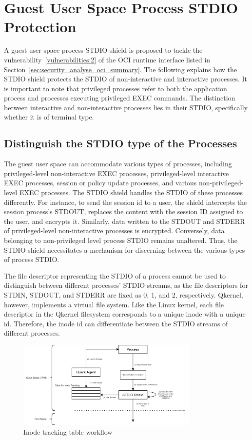 \section{Guest User Space Process STDIO Protection}
\label{sec:design_STDIO_PROTECTION}
A guest user-space process STDIO shield is proposed to tackle the vulnerability~\ref{vulnerabilities:2} of the OCI runtime interface listed in Section~\ref{sec:security_analyse_oci_summary}. The following explains how the STDIO shield protects the STDIO of non-interactive and interactive processes. It is important to note that privileged processes refer to 
both the application process and processes executing privileged EXEC commands. The distinction between interactive and non-interactive processes lies in their STDIO, specifically whether it is of terminal type. 


\subsection{Distinguish the STDIO type of the Processes}
\label{sec:design_Distinguish_io}

The guest user space can accommodate various types of processes, including privileged-level non-interactive EXEC processes, privileged-level interactive EXEC processes, session or policy update processes, and various non-privileged-level EXEC processes. The STDIO shield handles the STDIO of these processes differently. For instance, 
to send the session id to a user, the shield intercepts the session process's STDOUT, replaces the content with the session ID assigned to the user, and encrypts it. Similarly, data written to the STDOUT and STDERR of privileged-level non-interactive processes is encrypted. Conversely, data belonging 
to non-privileged level process STDIO remains unaltered. Thus, the STDIO shield necessitates a mechanism for discerning between the various types of process STDIO.
 
The file descriptor representing the STDIO of a process cannot be used to distinguish between different processes' STDIO streams, as the file descriptors for STDIN, STDOUT, and STDERR are fixed as 0, 1, and 2, respectively. Qkernel, however, implements a virtual file system. Like the Linux kernel, each file descriptor in the 
Qkernel filesystem corresponds to a unique inode with a unique id. Therefore, the inode id can differentiate between the STDIO streams of different processes.
\begin{figure}[!htb]
    \centering
    \includegraphics[width=0.8\textwidth]{images/differenciate_fds.png}
    \caption[Inode tracking table workflow]{Inode tracking table workflow}
    \label{fig:differenciate_fds}
\end{figure}
 

